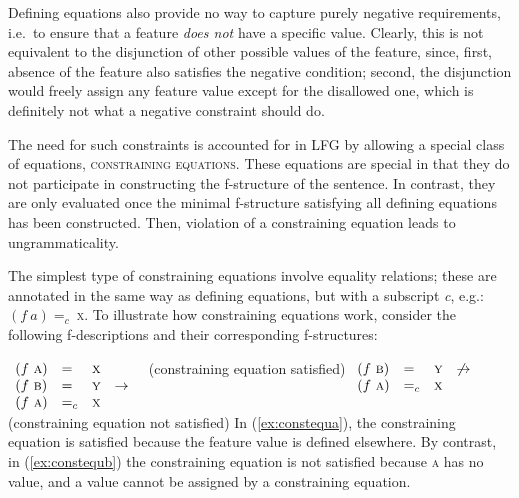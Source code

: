 \documentclass[output=paper,hidelinks]{langscibook}
\begin{document}
 Defining equations also provide no way to capture purely negative requirements, i.e.\ to ensure that a feature \textit{does not} have a specific value. Clearly, this is not equivalent to the disjunction of other possible values of the feature, since, first, absence of the feature also satisfies the negative condition; second, the disjunction would freely assign any feature value except for the disallowed one, which is definitely not what a negative constraint should do.

 The need for such constraints is accounted for in LFG by allowing a special class of equations, \textsc{constraining equations}. These equations are special in that they do not participate in constructing the f-structure of the sentence. In contrast, they are only evaluated once the minimal f-structure satisfying all defining equations has been constructed. Then, violation of a constraining equation leads to ungrammaticality.
 
 The simplest type of constraining equations involve equality relations; these are annotated in the same way as defining equations, but with a subscript \textit{c}, e.g.: $(f\:a)=_c~$\textsc{x}. To illustrate how constraining equations work, consider the following f-descriptions and their corresponding f-structures:
 
 \ea\label{ex:constequ}
 \ea\label{ex:constequa}
 $\begin{array}[t]{lll@{\hspace*{1em}}l@{\hspace*{1em}}}
 (f~\textsc{a}) &=& \textsc{x}\\
 (f~\textsc{b}) &=& \textsc{y} &   \rightarrow\\
 (f~\textsc{a}) &=_c& \textsc{x}\\
 \end{array}$
  \hfill(constraining equation satisfied)
 \ex \label{ex:constequb}
 $\begin{array}[t]{lll@{\hspace*{1em}}l@{\hspace*{1em}}}
 (f~\textsc{b}) &=& \textsc{y} &  \not\rightarrow\\
 (f~\textsc{a}) &=_c& \textsc{x}\\
 \end{array}$
  \hfill(constraining equation not satisfied)
 \z\z
In (\ref{ex:constequa}), the constraining equation is satisfied because the feature value is defined elsewhere. By contrast, in (\ref{ex:constequb}) the constraining equation is not satisfied because \textsc{a} has no value, and a value cannot be assigned by a constraining equation. 
 
\end{document}
